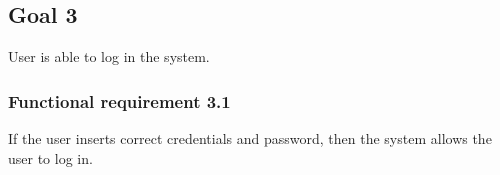 \subsection{Goal 3}
User is able to log in the system.

\setcounter{secnumdepth}{3}
\subsubsection{Functional requirement 3.1}
If the user inserts correct credentials and password, then the system allows the user to log in.
